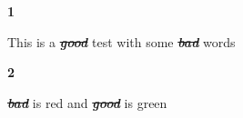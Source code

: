 \textbf{1} \par
This is a \textcolor[rgb]{1,0,0}{\st{\textbf{\textit{good}}}} test with some \textcolor[rgb]{0,1,0}{\st{\textbf{\textit{bad}}}} words
\par
\textbf{2} \par
\textcolor[rgb]{0,1,0}{\st{\textbf{\textit{bad}}}} is red and \textcolor[rgb]{1,0,0}{\st{\textbf{\textit{good}}}} is green
\par
